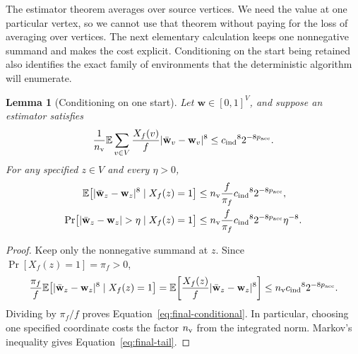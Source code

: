 \documentclass[11pt]{article}
\numberwithin{equation}{section}
\newtheorem{lemma}[theorem]{Lemma}
\theoremstyle{definition}
\theoremstyle{remark}
\begin{document}
The estimator theorem averages over source vertices. We need the value at one particular vertex, so we cannot use that theorem without paying for the loss of averaging over vertices. The next elementary calculation keeps one nonnegative summand and makes the cost explicit. Conditioning on the start being retained also identifies the exact family of environments that the deterministic algorithm will enumerate.

\begin{lemma}[Conditioning on one start]\label{lem:final-majority}
Let ${\mathbf{w}}\in[0,1]^V$, and suppose an estimator satisfies
\[
\frac1{n_{\rm v}}\mathbb E\sum_{v\in V}\frac{X_f(v)}f
 |\bar {\mathbf{w}}_{v}-{\mathbf{w}}_{v}|^8\le {c_{\rm ind}}^8 2^{-8{p_{\rm acc}}}.
\]
For any specified $z\in V$ and every $\eta>0$,
\begin{align}
\mathbb E\bigl[|\bar {\mathbf{w}}_{z}-{\mathbf{w}}_{z}|^8\mid X_f(z)=1\bigr]
 &\le {n_{\rm v}}\frac f{\pi_f}{c_{\rm ind}}^8 2^{-8{p_{\rm acc}}},
 \label{eq:final-conditional}\\
\Pr\bigl[|\bar {\mathbf{w}}_{z}-{\mathbf{w}}_{z}|>\eta\mid X_f(z)=1\bigr]
 &\le {n_{\rm v}}\frac f{\pi_f}{c_{\rm ind}}^8 2^{-8{p_{\rm acc}}}\eta^{-8}.
 \label{eq:final-tail}
\end{align}
\end{lemma}

\begin{proof}
Keep only the nonnegative summand at $z$. Since
$\Pr[X_f(z)=1]=\pi_f>0$,
\[
 \frac{\pi_f}{f}
 \mathbb E\bigl[|\bar {\mathbf{w}}_{z}-{\mathbf{w}}_{z}|^8\mid X_f(z)=1\bigr]
 =\mathbb E\!\left[\frac{X_f(z)}f|\bar {\mathbf{w}}_{z}-{\mathbf{w}}_{z}|^8\right]
 \le {n_{\rm v}} {c_{\rm ind}}^8 2^{-8{p_{\rm acc}}}.
\]
Dividing by $\pi_f/f$ proves
Equation~\eqref{eq:final-conditional}. In particular, choosing one
specified coordinate costs the factor ${n_{\rm v}}$ from the integrated norm.
Markov's inequality gives Equation~\eqref{eq:final-tail}.
\end{proof}
\end{document}
